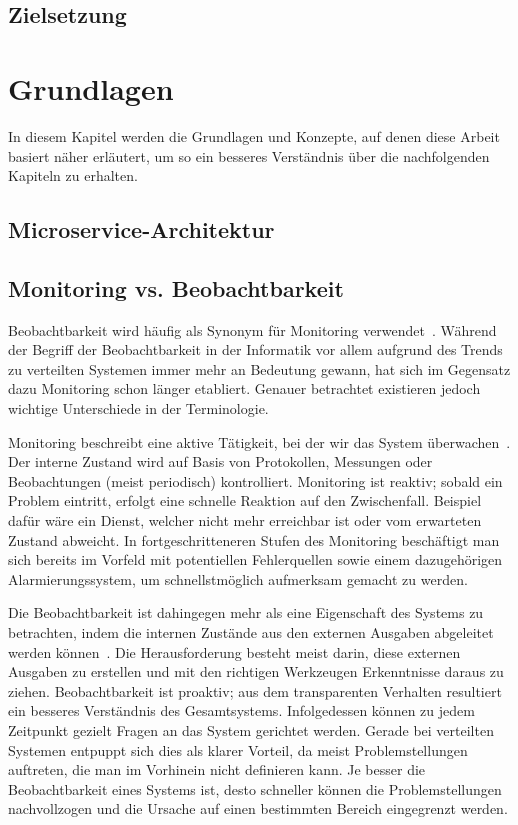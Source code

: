\documentclass[a4paper,12p]{article}
\begin{document}
\subsection{Zielsetzung}

\section{Grundlagen}
In diesem Kapitel werden die Grundlagen und Konzepte, auf denen diese Arbeit basiert näher erläutert, um so ein besseres Verständnis über die nachfolgenden Kapiteln zu erhalten.

\subsection{Microservice-Architektur}


\subsection{Monitoring vs. Beobachtbarkeit}

Beobachtbarkeit wird häufig als Synonym für Monitoring verwendet~\cite{Hadfield2022}. Während der Begriff der Beobachtbarkeit in der Informatik vor allem aufgrund des Trends zu verteilten Systemen immer mehr an Bedeutung gewann, hat sich im Gegensatz dazu Monitoring schon länger etabliert. Genauer betrachtet existieren jedoch wichtige Unterschiede in der Terminologie.

Monitoring beschreibt eine aktive Tätigkeit, bei der wir das System überwachen~\cite[p.~310]{Newman2021}. Der interne Zustand wird auf Basis von Protokollen, Messungen oder Beobachtungen (meist periodisch) kontrolliert. Monitoring ist reaktiv; sobald ein Problem eintritt, erfolgt eine schnelle Reaktion auf den Zwischenfall. Beispiel dafür wäre ein Dienst, welcher nicht mehr erreichbar ist oder vom erwarteten Zustand abweicht. In fortgeschritteneren Stufen des Monitoring beschäftigt man sich bereits im Vorfeld mit potentiellen Fehlerquellen sowie einem dazugehörigen Alarmierungssystem, um schnellstmöglich aufmerksam gemacht zu werden.

Die Beobachtbarkeit ist dahingegen mehr als eine Eigenschaft des Systems zu betrachten, indem die internen Zustände aus den externen Ausgaben abgeleitet werden können~\cite[p.~309]{Newman2021}. Die Herausforderung besteht meist darin, diese externen Ausgaben zu erstellen und mit den richtigen Werkzeugen Erkenntnisse daraus zu ziehen. Beobachtbarkeit ist proaktiv; aus dem transparenten Verhalten resultiert ein besseres Verständnis des Gesamtsystems. Infolgedessen können zu jedem Zeitpunkt gezielt Fragen an das System gerichtet werden. Gerade bei verteilten Systemen entpuppt sich dies als klarer Vorteil, da meist Problemstellungen auftreten, die man im Vorhinein nicht definieren kann. Je besser die Beobachtbarkeit eines Systems ist, desto schneller können die Problemstellungen nachvollzogen und die Ursache auf einen bestimmten Bereich eingegrenzt werden.
\end{document}
